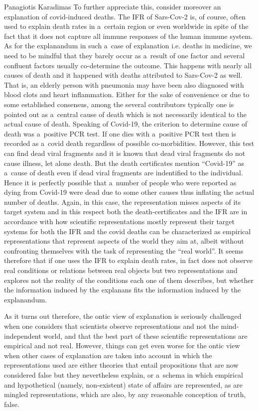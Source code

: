 \begin{artengenv}{Panagiotis Karadimas}
To further appreciate this, consider moreover an explanation of covid-induced deaths. The IFR of Sars-Cov-2 is, of course, often used to explain death rates in a~certain region or even worldwide in spite of the fact that it does not capture all immune responses of the human immune system. As for the explanandum in such a~case of explanation i.e. deaths in medicine, we need to be mindful that they barely occur as a~result of one factor and several confluent factors usually co-determine the outcome. This happens with nearly all causes of death and it happened with deaths attributed to Sars-Cov-2 as well. That is, an elderly person with pneumonia may have been also diagnosed with blood clots and heart inflammation. Either for the sake of convenience or due to some established consensus, among the several contributors typically one is pointed out as a~central cause of death which is not necessarily identical to the actual cause of death. Speaking of Covid-19, the criterion to determine cause of death was a~positive PCR test. If one dies with a~positive PCR test then is recorded as a~covid death regardless of possible co-morbidities. However, this test can find dead viral fragments and it is known that dead viral fragments do not cause illness, let alone death. But the death certificates mention ``Covid-19'' as a~cause of death even if dead viral fragments are indentified to the individual. Hence it is perfectly possible that a~number of people who were reported as dying from Covid-19 were dead due to some other causes
\parencite[][]{jefferson_are_2020} %
 thus inflating the actual number of deaths. Again, in this case, the representation misses aspects of its target system and in this respect both the death-certificates and the IFR are in accordance with how scientific representations mostly represent their target systems for both the IFR and the covid deaths can be characterized as empirical representations that represent aspects of the world they aim at, albeit without confronting themselves with the task of representing the ``real world''. It seems therefore that if one uses the IFR to explain death rates, in fact does not observe real conditions or relations between real objects but two representations and explores not the reality of the conditions each one of them describes, but whether the information induced by the explanans fits the information induced by the explanandum.

As it turns out therefore, the ontic view of explanation is seriously challenged when one considers that scientists observe representations and not the mind-independent world, and that the best part of these scientific representations are empirical and not real. However, things can get even worse for the ontic view when other cases of explanation are taken into account in which the representations used are either theories that entail propositions that are now considered false but they nevertheless explain, or a~schema in which empirical and hypothetical (namely, non-existent) state of affairs are represented, as are mingled representations, which are also, by any reasonable conception of truth, false.


\end{artengenv}
